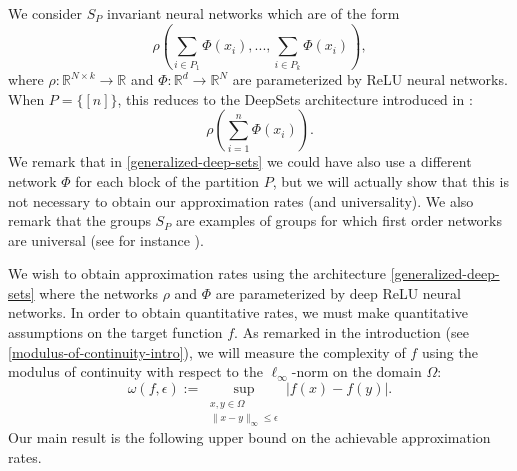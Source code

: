 \documentclass[twoside,11pt]{article}
\begin{document}
We consider  $S_P$ invariant neural networks which are of the form
\begin{equation}\label{generalized-deep-sets}
    \rho\left(\sum_{i\in P_1}\Phi(x_i),...,\sum_{i\in P_k}\Phi(x_i)\right),
\end{equation}
where $\rho:\mathbb{R}^{N\times k}\rightarrow \mathbb{R}$ and $\Phi:\mathbb{R}^d\rightarrow \mathbb{R}^N$ are parameterized by ReLU neural networks. When $P = \{[n]\}$, this reduces to the DeepSets architecture introduced in \cite{zaheer2017deep}:
\begin{equation}
    \rho\left(\sum_{i=1}^n\Phi(x_i)\right).
\end{equation}
We remark that in \eqref{generalized-deep-sets} we could have also use a different network $\Phi$ for each block of the partition $P$, but we will actually show that this is not necessary to obtain our approximation rates (and universality). We also remark that the groups $S_P$ are examples of groups for which first order networks are universal (see for instance \cite{maron2019universality}).

We wish to obtain approximation rates using the architecture \eqref{generalized-deep-sets} where the networks $\rho$ and $\Phi$ are parameterized by deep ReLU neural networks. In order to obtain quantitative rates, we must make quantitative assumptions on the target function $f$. As remarked in the introduction (see \eqref{modulus-of-continuity-intro}), we will measure the complexity of $f$ using the modulus of continuity with respect to the $\ell_\infty$-norm on the domain $\Omega$:
\begin{equation}
    \omega(f,\epsilon) := \sup_{\substack{x,y\in \Omega\\\|x - y\|_{\infty} \leq \epsilon}} |f(x) - f(y)|.
\end{equation}
Our main result is the following upper bound on the achievable approximation rates.
\end{document}
